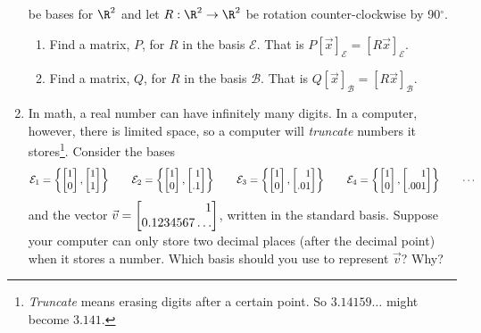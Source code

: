 \begin{enumerate}
		be bases for $\R^2$ and let $R:\R^2\to\R^2$ be rotation counter-clockwise by 90$^\circ$.
		\begin{enumerate}
			\item Find a matrix, $P$, for $R$ in the basis $\mathcal E$. That is $P[\vec x]_{\mathcal E} = [R\vec x]_{\mathcal E}$.
			\item Find a matrix, $Q$, for $R$ in the basis $\mathcal B$. That is $Q[\vec x]_{\mathcal B} = [R\vec x]_{\mathcal B}$.
		\end{enumerate}
	\item In math, a real number can have infinitely many digits. In a computer, however, there is limited space, so a computer
		will \emph{truncate} numbers it stores\footnote{ \emph{Truncate} means erasing digits after a certain point. So $3.14159\ldots$ might become
		$3.141$.}. Consider the bases
		\[
			\mathcal E_1=\left\{\mat{1\\0},\mat{1\\1}\right\}\qquad
			\mathcal E_2=\left\{\mat{1\\0},\mat{1\\.1}\right\}\qquad
			\mathcal E_3=\left\{\mat{1\\0},\mat{1\\.01}\right\}\qquad
			\mathcal E_4=\left\{\mat{1\\0},\mat{1\\.001}\right\}\qquad\cdots
		\]
		and the vector $\vec v=\mat{1\\0.1234567\ldots}$, written in the standard basis. Suppose your computer can only store two decimal places
		(after the decimal point) when it stores a number. Which basis should you use to represent $\vec v$? Why?
	
\end{enumerate}